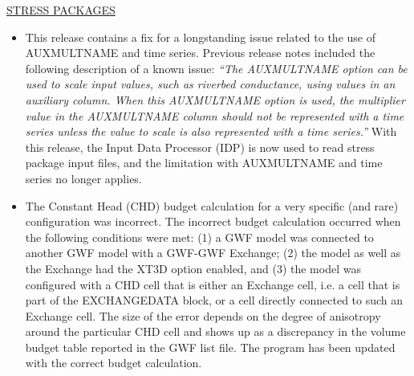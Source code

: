 	\underline{STRESS PACKAGES}
	\begin{itemize}
		\item This release contains a fix for a longstanding issue related to the use of AUXMULTNAME and time series.  Previous release notes included the following description of a known issue: \textit{``The AUXMULTNAME option can be used to scale input values, such as riverbed conductance, using values in an auxiliary column.  When this AUXMULTNAME option is used, the multiplier value in the AUXMULTNAME column should not be represented with a time series unless the value to scale is also represented with a time series.''}  With this release, the Input Data Processor (IDP) is now used to read stress package input files, and the limitation with AUXMULTNAME and time series no longer applies.
		\item The Constant Head (CHD) budget calculation for a very specific (and rare) configuration was incorrect. The incorrect budget calculation occurred when the following conditions were met: (1) a GWF model was connected to another GWF model with a GWF-GWF Exchange; (2) the model as well as the Exchange had the XT3D option enabled, and (3) the model was configured with a CHD cell that is either an Exchange cell, i.e. a cell that is part of the EXCHANGEDATA block, or a cell directly connected to such an Exchange cell.  The size of the error depends on the degree of anisotropy around the particular CHD cell and shows up as a discrepancy in the volume budget table reported in the GWF list file. The program has been updated with the correct budget calculation.
	\end{itemize}

